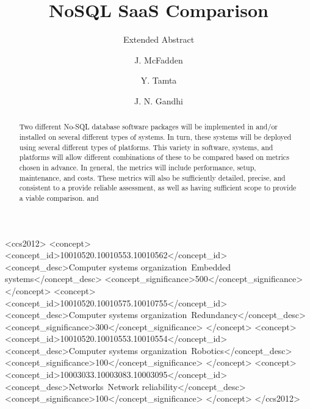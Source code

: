 \documentclass[sigconf]{acmart}
\begin{document}
\title{NoSQL SaaS Comparison}
\subtitle{Extended Abstract}


\author{J. McFadden}
\authornote{}
\orcid{}

\author{Y. Tamta}
\authornote{}
\orcid{}

\author{J. N. Gandhi}
\authornote{}
\orcid{}



\renewcommand{\shortauthors}{J. McFadden, Y. Tamta, J. N. Gandhi, et al}


\begin{abstract}
Two different No-SQL database software packages will be implemented in and/or installed on several different types of  systems.  In turn, these systems will be deployed using several different types of platforms. This variety in software, systems, and platforms will allow different combinations of these to be compared based on metrics chosen in advance.  In general, the metrics will include performance, setup, maintenance, and costs.  These metrics will also be sufficiently detailed, precise, and consistent to a provide reliable assessment, as well as having sufficient scope to provide a viable comparison.
and   
\end{abstract}

%
%
\begin{CCSXML}
<ccs2012>
 <concept>
  <concept_id>10010520.10010553.10010562</concept_id>
  <concept_desc>Computer systems organization~Embedded systems</concept_desc>
  <concept_significance>500</concept_significance>
 </concept>
 <concept>
  <concept_id>10010520.10010575.10010755</concept_id>
  <concept_desc>Computer systems organization~Redundancy</concept_desc>
  <concept_significance>300</concept_significance>
 </concept>
 <concept>
  <concept_id>10010520.10010553.10010554</concept_id>
  <concept_desc>Computer systems organization~Robotics</concept_desc>
  <concept_significance>100</concept_significance>
 </concept>
 <concept>
  <concept_id>10003033.10003083.10003095</concept_id>
  <concept_desc>Networks~Network reliability</concept_desc>
  <concept_significance>100</concept_significance>
 </concept>
</ccs2012>  
\end{CCSXML}
\end{document}
